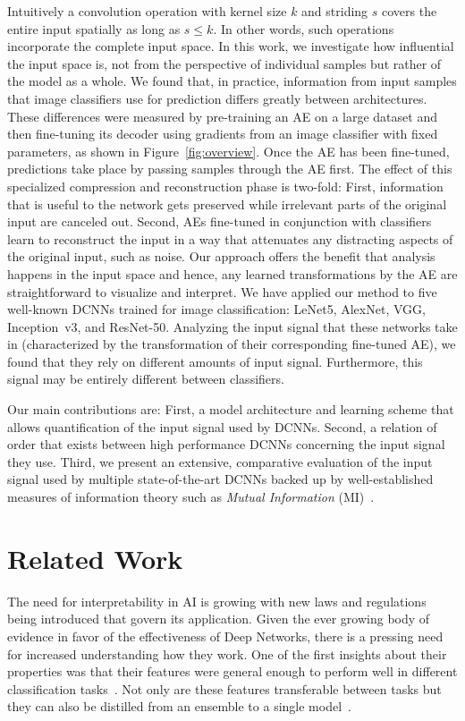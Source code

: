 \documentclass[10pt,twocolumn,a4paper]{article}
\begin{document}
Intuitively a convolution operation with kernel size $k$ and striding $s$ covers the entire input spatially as long as $s \le k$.
In other words, such operations incorporate the complete input space.
In this work, we investigate how influential the input space is, not from the perspective of individual samples but rather of the model as a whole.
We found that, in practice, information from input samples that image classifiers use for prediction differs greatly between architectures.
These differences were measured by pre-training an AE on a large dataset and then fine-tuning its decoder using gradients from an image classifier with fixed parameters, as shown in Figure~\ref{fig:overview}.
Once the AE has been fine-tuned, predictions take place by passing samples through the AE first.
The effect of this specialized compression and reconstruction phase is two-fold:
First, information that is useful to the network gets preserved while irrelevant parts of the original input are canceled out.
Second, AEs fine-tuned in conjunction with classifiers learn to reconstruct the input in a way that attenuates any distracting aspects of the original input, such as noise.
Our approach offers the benefit that analysis happens in the input space and hence, any learned transformations by the AE are straightforward to visualize and interpret.
We have applied our method to five well-known DCNNs trained for image classification: LeNet5, AlexNet, VGG, Inception~v3, and ResNet-50.
Analyzing the input signal that these networks take in (characterized by the transformation of their corresponding fine-tuned AE), we found that they rely on different amounts of input signal.
Furthermore, this signal may be entirely different between classifiers.

Our main contributions are:
First, a model architecture and learning scheme that allows quantification of the input signal used by DCNNs.
Second, a relation of order that exists between high performance DCNNs concerning the input signal they use.
Third, we present an extensive, comparative evaluation of the input signal used by multiple state-of-the-art DCNNs backed up by well-established measures of information theory such as \textit{Mutual Information} (MI)~\cite{strehl2002cluster}.



\section{Related Work}

The need for interpretability in AI is growing with new laws and regulations~\cite{GoodmanRegulations} being introduced that govern its application. Given the ever growing body of evidence in favor of the effectiveness of Deep Networks, there is a pressing need for increased understanding how they work.
One of the first insights about their properties was that their features were general enough to perform well in different classification tasks~\cite{yosinski2014transferable, sharif2014cnn}.
Not only are these features transferable between tasks but they can also be distilled from an ensemble to a single model~\cite{hinton2015distilling}.
\end{document}
